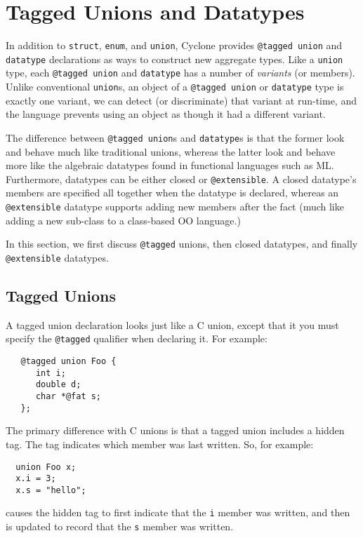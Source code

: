 \section{Tagged Unions and Datatypes}
\label{sec:taggedunions}

In addition to \texttt{struct}, \texttt{enum}, and \texttt{union},
Cyclone provides \texttt{@tagged union} and \texttt{datatype}
declarations as ways to construct new aggregate types.  Like a
\texttt{union} type, each \texttt{@tagged union} and \texttt{datatype}
has a number of \textit{variants} (or members).  Unlike conventional
\texttt{union}s, an object of a \texttt{@tagged union} or
\texttt{datatype} type is exactly one variant, we can detect (or
discriminate) that variant at run-time, and the language prevents
using an object as though it had a different variant.

The difference between \texttt{@tagged union}s and \texttt{datatype}s
is that the former look and behave much like traditional unions, 
whereas the latter look and behave more like the algebraic datatypes
found in functional languages such as ML\@.  Furthermore, datatypes
can be either closed or \texttt{@extensible}.  A closed datatype's
members are specified all together when the datatype is declared, 
whereas an \texttt{@extensible} datatype supports adding new members
after the fact (much like adding a new sub-class to a class-based
OO language.)  

In this section, we first discuss \texttt{@tagged} unions,
then closed datatypes, and finally \texttt{@extensible} datatypes.

\subsection{Tagged Unions}

A tagged union declaration looks just like a C union,
except that it you must specify the \texttt{@tagged} qualifier
when declaring it.  For example:
\begin{verbatim}
   @tagged union Foo {
      int i;
      double d;
      char *@fat s;
   };
\end{verbatim}
The primary difference with C unions is that a tagged union
includes a hidden tag.  The tag indicates which member was
last written.  So, for example:
\begin{verbatim}
  union Foo x;
  x.i = 3;
  x.s = "hello";
\end{verbatim}
causes the hidden tag to first indicate that the \texttt{i}
member was written, and then is updated to record that the
\texttt{s} member was written.  

